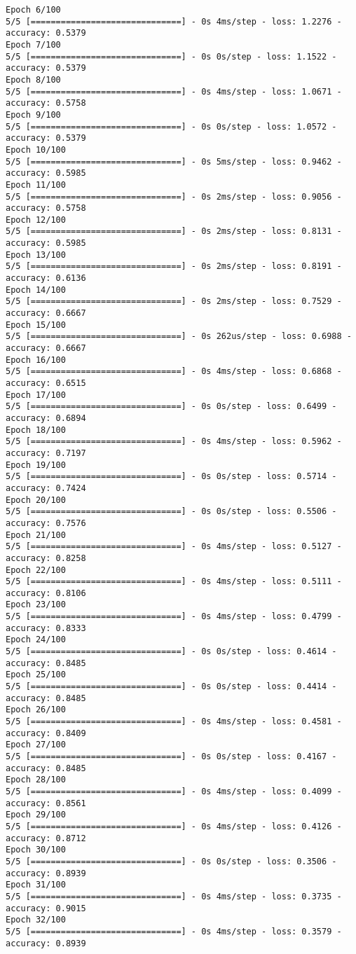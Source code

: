\documentclass[12pt]{article}
\begin{document}
\begin{lstlisting}
Epoch 6/100
5/5 [==============================] - 0s 4ms/step - loss: 1.2276 - accuracy: 0.5379
Epoch 7/100
5/5 [==============================] - 0s 0s/step - loss: 1.1522 - accuracy: 0.5379
Epoch 8/100
5/5 [==============================] - 0s 4ms/step - loss: 1.0671 - accuracy: 0.5758
Epoch 9/100
5/5 [==============================] - 0s 0s/step - loss: 1.0572 - accuracy: 0.5379
Epoch 10/100
5/5 [==============================] - 0s 5ms/step - loss: 0.9462 - accuracy: 0.5985
Epoch 11/100
5/5 [==============================] - 0s 2ms/step - loss: 0.9056 - accuracy: 0.5758
Epoch 12/100
5/5 [==============================] - 0s 2ms/step - loss: 0.8131 - accuracy: 0.5985
Epoch 13/100
5/5 [==============================] - 0s 2ms/step - loss: 0.8191 - accuracy: 0.6136
Epoch 14/100
5/5 [==============================] - 0s 2ms/step - loss: 0.7529 - accuracy: 0.6667
Epoch 15/100
5/5 [==============================] - 0s 262us/step - loss: 0.6988 - accuracy: 0.6667
Epoch 16/100
5/5 [==============================] - 0s 4ms/step - loss: 0.6868 - accuracy: 0.6515
Epoch 17/100
5/5 [==============================] - 0s 0s/step - loss: 0.6499 - accuracy: 0.6894
Epoch 18/100
5/5 [==============================] - 0s 4ms/step - loss: 0.5962 - accuracy: 0.7197
Epoch 19/100
5/5 [==============================] - 0s 0s/step - loss: 0.5714 - accuracy: 0.7424
Epoch 20/100
5/5 [==============================] - 0s 0s/step - loss: 0.5506 - accuracy: 0.7576
Epoch 21/100
5/5 [==============================] - 0s 4ms/step - loss: 0.5127 - accuracy: 0.8258
Epoch 22/100
5/5 [==============================] - 0s 4ms/step - loss: 0.5111 - accuracy: 0.8106
Epoch 23/100
5/5 [==============================] - 0s 4ms/step - loss: 0.4799 - accuracy: 0.8333
Epoch 24/100
5/5 [==============================] - 0s 0s/step - loss: 0.4614 - accuracy: 0.8485
Epoch 25/100
5/5 [==============================] - 0s 0s/step - loss: 0.4414 - accuracy: 0.8485
Epoch 26/100
5/5 [==============================] - 0s 4ms/step - loss: 0.4581 - accuracy: 0.8409
Epoch 27/100
5/5 [==============================] - 0s 0s/step - loss: 0.4167 - accuracy: 0.8485
Epoch 28/100
5/5 [==============================] - 0s 4ms/step - loss: 0.4099 - accuracy: 0.8561
Epoch 29/100
5/5 [==============================] - 0s 4ms/step - loss: 0.4126 - accuracy: 0.8712
Epoch 30/100
5/5 [==============================] - 0s 0s/step - loss: 0.3506 - accuracy: 0.8939
Epoch 31/100
5/5 [==============================] - 0s 4ms/step - loss: 0.3735 - accuracy: 0.9015
Epoch 32/100
5/5 [==============================] - 0s 4ms/step - loss: 0.3579 - accuracy: 0.8939

\end{lstlisting}
\end{document}
